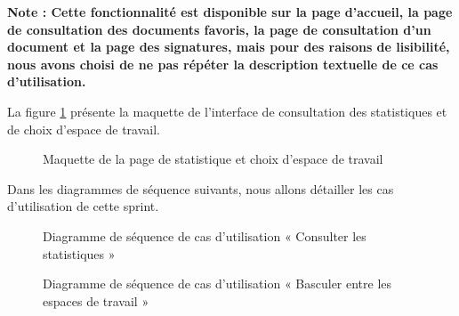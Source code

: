 \textbf{Note : Cette fonctionnalité est disponible sur la page d'accueil, la page de consultation des documents favoris, la page de consultation d'un document et la page des signatures, mais pour des raisons de lisibilité, nous avons choisi de ne pas répéter la description textuelle de ce cas d'utilisation.}

La figure \ref{fig:design_statistique} présente la maquette de l'interface de consultation des statistiques et de choix d'espace de travail.

\begin{figure}[H]
  \centering
  \caption{Maquette de la page de statistique et choix d'espace de travail}
  \label{fig:design_statistique}
\end{figure}

Dans les diagrammes de séquence suivants, nous allons détailler les cas d'utilisation de cette sprint.

\begin{figure}[H]
  \centering
  \caption{Diagramme de séquence de cas d'utilisation « Consulter les statistiques »}
  \label{fig:sequence_view_stats}
\end{figure}

\begin{figure}[H]
  \centering
  \caption{Diagramme de séquence de cas d'utilisation « Basculer entre les espaces de travail »}
  \label{fig:sequence_switch_workspace}
\end{figure}

